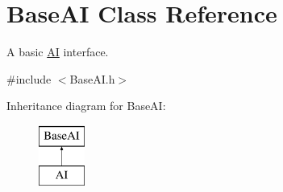 \hypertarget{classBaseAI}{
\section{BaseAI Class Reference}
\label{classBaseAI}
}


A basic \hyperlink{classAI}{AI} interface.  




{\ttfamily \#include $<$BaseAI.h$>$}

Inheritance diagram for BaseAI:\begin{figure}[H]
\begin{center}
\leavevmode
\includegraphics[height=2.000000cm]{classBaseAI}
\end{center}
\end{figure}

